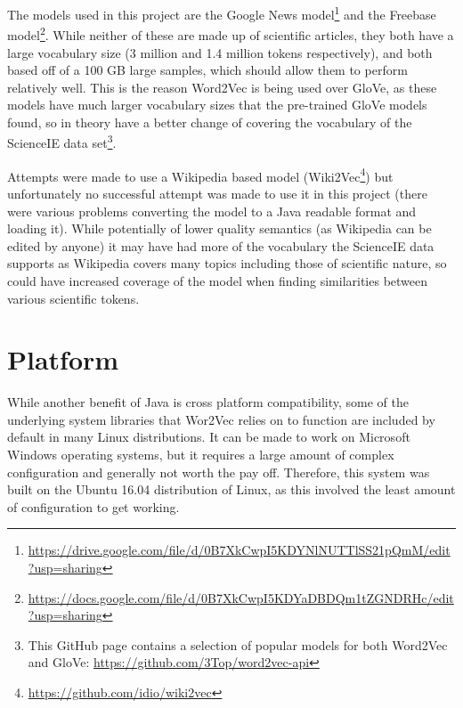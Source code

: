 The models used in this project are the Google News model\footnote{\href{https://drive.google.com/file/d/0B7XkCwpI5KDYNlNUTTlSS21pQmM/edit?usp=sharing}{https://drive.google.com/file/d/0B7XkCwpI5KDYNlNUTTlSS21pQmM/edit?usp=sharing}} and the Freebase model\footnote{\href{https://docs.google.com/file/d/0B7XkCwpI5KDYaDBDQm1tZGNDRHc/edit?usp=sharing}{https://docs.google.com/file/d/0B7XkCwpI5KDYaDBDQm1tZGNDRHc/edit?usp=sharing}}. While neither of these are made up of scientific articles, they both have a large vocabulary size (3 million and 1.4 million tokens respectively), and both based off of a 100 GB large samples, which should allow them to perform relatively well. This is the reason Word2Vec is being used over GloVe, as these models have much larger vocabulary sizes that the pre-trained GloVe models found, so in theory have a better change of covering the vocabulary of the ScienceIE data set\footnote{This GitHub page contains a selection of popular models for both Word2Vec and GloVe: \href{https://github.com/3Top/word2vec-api}{https://github.com/3Top/word2vec-api}}.

Attempts were made to use a Wikipedia based model (Wiki2Vec\footnote{\href{https://github.com/idio/wiki2vec}{https://github.com/idio/wiki2vec}}) but unfortunately no successful attempt was made to use it in this project (there were various problems converting the model to a Java readable format and loading it). While potentially of lower quality semantics (as Wikipedia can be edited by anyone) it may have had more of the vocabulary the ScienceIE data supports as Wikipedia covers many topics including those of scientific nature, so could have increased coverage of the model when finding similarities between various scientific tokens. 

\section{Platform}
While another benefit of Java is cross platform compatibility, some of the underlying system libraries that Wor2Vec relies on to function are included by default in many Linux distributions. It can be made to work on Microsoft Windows operating systems, but it requires a large amount of complex configuration and generally not worth the pay off. Therefore, this system was built on the Ubuntu 16.04 distribution of Linux, as this involved the least amount of configuration to get working.

